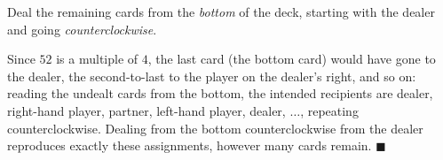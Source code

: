 Deal the remaining cards from the \emph{bottom} of the deck, starting with the dealer and going \emph{counterclockwise}.

Since $52$ is a multiple of $4$, the last card (the bottom card) would have gone to the dealer, the second-to-last to the player on the dealer's right, and so on: reading the undealt cards from the bottom, the intended recipients are dealer, right-hand player, partner, left-hand player, dealer, $\dots$, repeating counterclockwise. Dealing from the bottom counterclockwise from the dealer reproduces exactly these assignments, however many cards remain. $\blacksquare$
